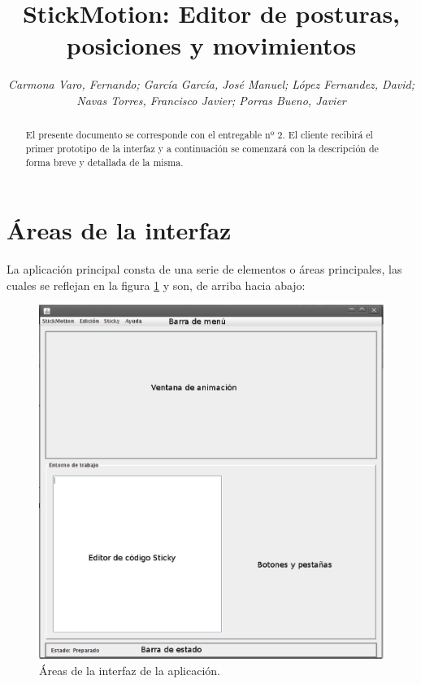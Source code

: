 \documentclass[a4paper,12pt]{article}
\title{\textbf{StickMotion:} Editor de posturas, posiciones y movimientos}
\author{\small\textit{Carmona Varo, Fernando; García García, José Manuel; López Fernandez, David;}\\
	\small\textit{Navas Torres, Francisco Javier; Porras Bueno, Javier}}
\begin{document}
  \maketitle %

  \begin{abstract}
    El presente documento se corresponde con el entregable nº 2. El cliente recibirá el primer prototipo de la interfaz y a continuación se comenzará
    con la descripción de forma breve y detallada de la misma.\\
  \end{abstract}

  \section{Áreas de la interfaz}
  La aplicación principal consta de una serie de elementos o áreas principales, las cuales se reflejan en la figura \ref{interfaz} y son, de arriba 
  hacia abajo:
  \begin{figure} [h] \begin{center}
    \includegraphics[height=0.95\textwidth]{AreasInterfazTexto}
    \caption{Áreas de la interfaz de la aplicación.} \label{interfaz}
  \end{center} \end{figure}
\end{document}

